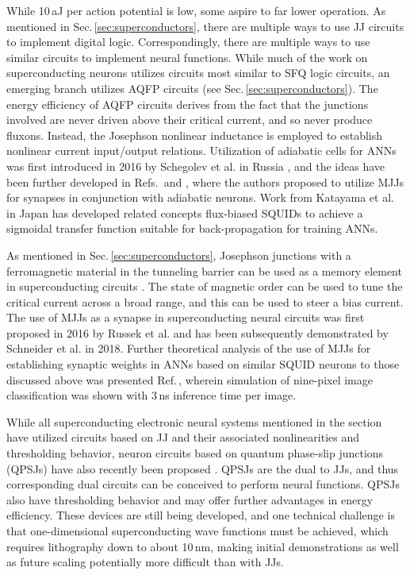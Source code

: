 \documentclass[twocolumn]{article}
\newcommand{\onlinecite}[1]{\hspace{-1 ex} \nocite{#1}\citenum{#1}}
\begin{document}
While 10\,aJ per action potential is low, some aspire to far lower operation. As mentioned in Sec.\,\ref{sec:superconductors}, there are multiple ways to use JJ circuits to implement digital logic. Correspondingly, there are multiple ways to use similar circuits to implement neural functions. While much of the work on superconducting neurons utilizes circuits most similar to SFQ logic circuits, an emerging branch utilizes AQFP circuits (see Sec.\,\ref{sec:superconductors}). The energy efficiency of AQFP circuits derives from the fact that the junctions involved are never driven above their critical current, and so never produce fluxons. Instead, the Josephson nonlinear inductance is employed to establish nonlinear current input/output relations. Utilization of adiabatic cells for ANNs was first introduced in 2016 by Schegolev et al. in Russia \cite{sckl2016}, and the ideas have been further developed in Refs.\,\onlinecite{klsc2018} and \onlinecite{sosc2018}, where the authors proposed to utilize MJJs for synapses in conjunction with adiabatic neurons.  Work from Katayama et al. in Japan \cite{kafu2018} has developed related concepts flux-biased SQUIDs to achieve a sigmoidal transfer function suitable for back-propagation for training ANNs.

As mentioned in Sec.\,\ref{sec:superconductors}, Josephson junctions with a ferromagnetic material in the tunneling barrier can be used as a memory element in superconducting circuits \cite{vevi2013}. The state of magnetic order can be used to tune the critical current across a broad range, and this can be used to steer a bias current. The use of MJJs as a synapse in superconducting neural circuits was first proposed in 2016 by Russek et al. \cite{ru2016} and has been subsequently demonstrated by Schneider et al. \cite{scdo2018} in 2018. Further theoretical analysis of the use of MJJs for establishing synaptic weights in ANNs based on similar SQUID neurons to those discussed above \cite{hiak1991} was presented Ref.\,\cite{scdo2018b}, wherein simulation of nine-pixel image classification was shown with 3\,ns inference time per image. 

While all superconducting electronic neural systems mentioned in the section have utilized circuits based on JJ and their associated nonlinearities and thresholding behavior, neuron circuits based on quantum phase-slip junctions (QPSJs) have also recently been proposed \cite{chgo2018}. QPSJs are the dual to JJs, and thus corresponding dual circuits can be conceived to perform neural functions. QPSJs also have thresholding behavior and may offer further advantages in energy efficiency. These devices are still being developed, and one technical challenge is that one-dimensional superconducting wave functions must be achieved, which requires lithography down to about 10\,nm, making initial demonstrations as well as future scaling potentially more difficult than with JJs.
\end{document}
